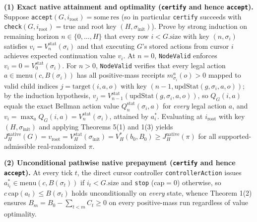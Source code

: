 \documentclass[11pt,letterpaper]{article}
\begin{document}
\textbf{(1) Exact native attainment and optimality (\texttt{certify} and
hence \texttt{accept}).} Suppose
\texttt{accept}\((G, i_{\mathrm{root}}) = \mathrm{some\ res}\) (so in
particular \texttt{certify} succeeds with
\texttt{check}\((G, i_{\mathrm{root}}) = \mathrm{true}\) and root key
\((H, \sigma_{\mathrm{init}})\)). Prove by strong induction on remaining
horizon \(n \in \{0, \dots, H\}\) that every row \(i < G.\mathrm{size}\)
with key \((n, \sigma_i)\) satisfies
\(v_i = V_n^{\mathrm{stat}}(\sigma_i)\) and that executing \(G\)'s
stored actions from cursor \(i\) achieves expected continuation value
\(v_i\). At \(n = 0\), \texttt{NodeValid} enforces
\(v_i = 0 = V_0^{\mathrm{stat}}(\sigma_i)\). For \(n > 0\),
\texttt{NodeValid} verifies that every legal action
\(a \in \mathrm{menu}(c, B(\sigma_i))\) has all positive-mass receipts
\(m_{\sigma_i}^a(o) > 0\) mapped to valid child indices
\(j = \mathrm{target}(i,a,o)\) with key
\((n-1, \mathrm{updStat}(g, \sigma_i, a, o))\); by the induction
hypothesis,
\(v_j = V_{n-1}^{\mathrm{stat}}(\mathrm{updStat}(g, \sigma_i, a, o))\),
so \(Q_G(i, a)\) equals the exact Bellman action value
\(Q_n^{\mathrm{stat}}(\sigma_i, a)\) for \emph{every} legal action
\(a\), and \(v_i = \max_a Q_G(i,a) = V_n^{\mathrm{stat}}(\sigma_i)\),
attained by \(a_i^*\). Evaluating at \(i_{\mathrm{root}}\) with key
\((H, \sigma_{\mathrm{init}})\) and applying Theorems 5(1) and 1(3)
yields
\(J_H^{\mathrm{native}}(G) = v_{\mathrm{root}} = V_H^{\mathrm{stat}}(\sigma_{\mathrm{init}}) = V_H^*(b_0, B_0) \ge J_H^{\mathrm{native}}(\pi)\)
for all supported-admissible real-randomized \(\pi\).

\textbf{(2) Unconditional pathwise native prepayment (\texttt{certify}
and hence \texttt{accept}).} At every tick \(t\), the direct cursor
controller \texttt{controllerAction} issues
\(a_{i_t}^* \in \mathrm{menu}(c, B(\sigma_t))\) if
\(i_t < G.\mathrm{size}\) and \texttt{stop} (\(\mathrm{cap} = 0\))
otherwise, so \(c\,\mathrm{cap}(a_t) \le B(\sigma_t)\) holds
unconditionally on \emph{every} state, whence Theorem 1(2) ensures
\(B_m = B_0 - \sum_{t<m} C_t \ge 0\) on every positive-mass run
regardless of value optimality.
\end{document}
